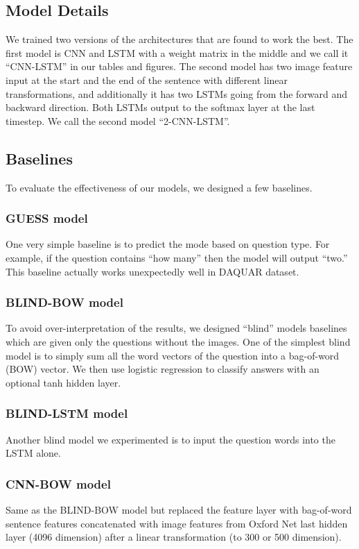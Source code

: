 \documentclass{article}
\renewcommand{\#}[1]{\textbf{#1}}
\begin{document}
\subsection{Model Details}
We trained two versions of the architectures that are found to work the best. The first model is CNN and LSTM with a weight matrix in the middle and we call it ``CNN-LSTM'' in our tables and figures. The second model has two image feature input at the start and the end of the sentence with different linear transformations, and additionally it has two LSTMs going from the forward and backward direction. Both LSTMs output to the softmax layer at the last timestep. We call the second model ``2-CNN-LSTM''.

\subsection{Baselines}
To evaluate the effectiveness of our models, we designed a few baselines. 

\subsubsection{GUESS model}
One very simple baseline is to predict the mode based on question type. For example, if the question contains ``how many'' then the model will output ``two.'' This baseline actually works unexpectedly well in DAQUAR dataset.

\subsubsection{BLIND-BOW model}
To avoid over-interpretation of the results, we designed ``blind'' models baselines which are given only the questions without the images. One of the simplest blind model is to simply sum all the word vectors of the question into a bag-of-word (BOW) vector. We then use logistic regression to classify answers with an optional tanh hidden layer.

\subsubsection{BLIND-LSTM model}
Another blind model we experimented is to input the question words into the LSTM alone. 

\subsubsection{CNN-BOW model}
Same as the BLIND-BOW model but replaced the feature layer with bag-of-word sentence features concatenated with image features from Oxford Net last hidden layer (4096 dimension) after a linear transformation (to 300 or 500 dimension).
\end{document}
